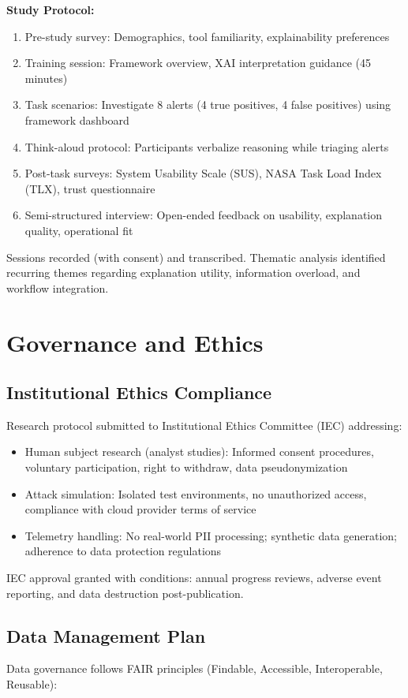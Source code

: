 \textbf{Study Protocol:}
\begin{enumerate}
    \item Pre-study survey: Demographics, tool familiarity, explainability preferences
    \item Training session: Framework overview, XAI interpretation guidance (45 minutes)
    \item Task scenarios: Investigate 8 alerts (4 true positives, 4 false positives) using framework dashboard
    \item Think-aloud protocol: Participants verbalize reasoning while triaging alerts
    \item Post-task surveys: System Usability Scale (SUS), NASA Task Load Index (TLX), trust questionnaire
    \item Semi-structured interview: Open-ended feedback on usability, explanation quality, operational fit
\end{enumerate}

Sessions recorded (with consent) and transcribed. Thematic analysis identified recurring themes regarding explanation utility, information overload, and workflow integration.

\section{Governance and Ethics}\label{sec:method-ethics}
\subsection{Institutional Ethics Compliance}
Research protocol submitted to Institutional Ethics Committee (IEC) addressing:
\begin{itemize}
    \item Human subject research (analyst studies): Informed consent procedures, voluntary participation, right to withdraw, data pseudonymization
    \item Attack simulation: Isolated test environments, no unauthorized access, compliance with cloud provider terms of service
    \item Telemetry handling: No real-world PII processing; synthetic data generation; adherence to data protection regulations
\end{itemize}

IEC approval granted with conditions: annual progress reviews, adverse event reporting, and data destruction post-publication.

\subsection{Data Management Plan}
Data governance follows FAIR principles (Findable, Accessible, Interoperable, Reusable):

